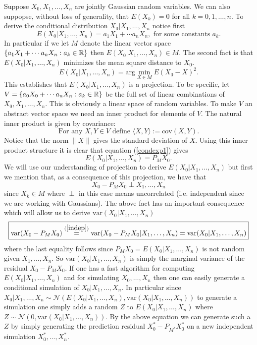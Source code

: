 \documentclass[11pt]{report}
\begin{document}
Suppose $X_0,X_1,\ldots, X_n$ are jointly Gaussian random variables. We can also suppopse, without loss of generality, that $E(X_k)=0$ for all $k=0,1,\ldots, n$.
To derive the conditional distribution $X_0|X_1,\ldots, X_n$ notice first
\[
{E(X_0|X_1,\ldots, X_n) = a_1 X_1 + \cdots a_n X_n,\text{ for some constants $a_k$.}}
\]
In particular if we let $M$ denote the linear vector space $\{a_1 X_1 + \cdots a_n X_n: a_k\in\Bbb R\}$ then $E(X_0|X_1,\ldots, X_n)\in M$. The second fact is that  $E(X_0|X_1,\ldots, X_n)$ minimizes the mean square distance to $X_0$. 
\begin{equation}\label{condexp1}
{E(X_0|X_1,\ldots, X_n) = \text{arg}\min_{X \in M} E(X_0 - X)^2. }
\end{equation}
 This establishes that $E(X_0|X_1,\ldots, X_n)$ is a projection. To be specific, let $V=\{a_0 X_0 + \cdots a_n X_n: a_k\in\Bbb R\}$ be the full set of linear combinations of $X_0,X_1,\ldots, X_n$. This is obviously a linear space of random variables. To make $V$ an abstract vector space we need an inner product for elements of $V$. The natural inner product is given by covariance:
\[ \text{For any $X,Y\in V$ define $\langle X,Y\rangle :=\text{cov}(X,Y)$.}  \]
Notice that the norm $\| X\|$ gives the standard deviation of $X$. Using this inner product structure it is clear that equation (\ref{condexp1}) gives
\begin{equation}
\label{condexp2} 
\boxed{E(X_0|X_1,\ldots, X_n) = P_M X_0.} 
\end{equation}
We will use our understanding of projection to derive $E(X_0|X_1,\ldots, X_n)$ but first we mention that,
as a consequence of this projection, we have that 
\begin{equation} 
\label{indep}
\boxed{X_0 - P_M X_0 \perp X_1,\ldots, X_n}
\end{equation}
since $X_k\in M$
where $\perp$ in this case means uncorrelated (i.e. independent since we are working with Gaussians). The above fact has an important consequence which will allow us to derive $\text{var}(X_0|X_1,\ldots, X_n)$
\[
\boxed{\text{var}(X_0 - P_M X_0 ) \overset{(\ref{indep})}= \text{var}(X_0 - P_M X_0 |X_1,\ldots, X_n) = \text{var}(X_0  |X_1,\ldots, X_n)}
\]
where the last equality follows since $P_M X_0= E(X_0|X_1,\ldots, X_n)$ is not random given $X_1,\ldots, X_n$.
So $\text{var}(X_0  |X_1,\ldots, X_n)$ is simply the marginal variance of the residual $X_0 - P_M X_0$.  If one has a fast algorithm for computing  $E(X_0|X_1,\ldots, X_n)$  and for simulating $X_0,\ldots, X_n$ then one can easily generate a conditional simulation of $X_0  |X_1,\ldots, X_n$. In particular since $X_0  |X_1,\ldots, X_n\sim \mathcal N(E(X_0|X_1,\ldots, X_n), \text{var}(X_0|X_1,\ldots, X_n))$ to generate a simulation  one simply adds a random $Z$ to  $E(X_0|X_1,\ldots, X_n) $ where $Z\sim \mathcal N(0, \text{var}(X_0|X_1,\ldots, X_n))$. By the above equation we can generate such a $Z$ by simply generating the prediction residual $X^*_0 - P_{M^*} X_0^*$ on a new independent simulation $X_0^*, \ldots, X_n^*$.
\end{document}
